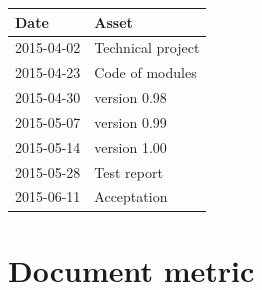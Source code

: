 \documentclass{article}
\begin{document}
\begin{center}

	\begin{tabular}{| l | p{7cm} |}

		\hline
		\cellcolor[HTML]{C0C0C0}Date & \cellcolor[HTML]{C0C0C0} Asset \\
		
		\hline
	  	2015-04-02 & Technical project \\
		
		\hline
	  	2015-04-23 & Code of modules\\
	
		\hline
		2015-04-30 & version 0.98\\

		\hline
		2015-05-07 & version 0.99\\	
		
		\hline
		2015-05-14 & version 1.00\\
		
		\hline
		2015-05-28 & Test report\\
		
		\hline
		2015-06-11 & Acceptation \\
		
		\hline
	
	\end{tabular}

\end{center}

\section{Document metric}
\end{document}
